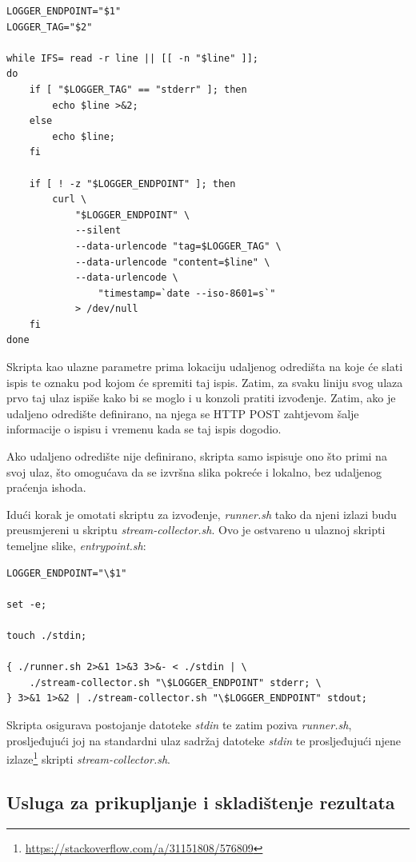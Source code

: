 \documentclass[times, utf8, zavrsni]{fer}
\begin{document}
\begin{lstlisting}
LOGGER_ENDPOINT="$1"
LOGGER_TAG="$2"

while IFS= read -r line || [[ -n "$line" ]];
do
	if [ "$LOGGER_TAG" == "stderr" ]; then
		echo $line >&2;
	else
		echo $line;
	fi

	if [ ! -z "$LOGGER_ENDPOINT" ]; then
		curl \
			"$LOGGER_ENDPOINT" \
			--silent
			--data-urlencode "tag=$LOGGER_TAG" \
			--data-urlencode "content=$line" \
			--data-urlencode \
				"timestamp=`date --iso-8601=s`"
			> /dev/null
	fi
done
\end{lstlisting}

Skripta kao ulazne parametre prima lokaciju udaljenog odredišta na koje će slati ispis te oznaku pod kojom će spremiti taj ispis. Zatim, za svaku liniju svog ulaza prvo taj ulaz ispiše kako bi se moglo i u konzoli pratiti izvođenje. Zatim, ako je udaljeno odredište definirano, na njega se HTTP POST zahtjevom šalje informacije o ispisu i vremenu kada se taj ispis dogodio.

Ako udaljeno odredište nije definirano, skripta samo ispisuje ono što primi na svoj ulaz, što omogućava da se izvršna slika pokreće i lokalno, bez udaljenog praćenja ishoda.

Idući korak je omotati skriptu za izvođenje, {\textit{runner.sh}} tako da njeni izlazi budu preusmjereni u skriptu {\textit{stream-collector.sh}}. Ovo je ostvareno u ulaznoj skripti temeljne slike, {\textit{entrypoint.sh}}:

\begin{lstlisting}
LOGGER_ENDPOINT="\$1"

set -e;

touch ./stdin;

{ ./runner.sh 2>&1 1>&3 3>&- < ./stdin | \
	./stream-collector.sh "\$LOGGER_ENDPOINT" stderr; \
} 3>&1 1>&2 | ./stream-collector.sh "\$LOGGER_ENDPOINT" stdout;
\end{lstlisting}

Skripta osigurava postojanje datoteke {\textit{stdin}} te zatim poziva {\textit{runner.sh}}, prosljeđujući joj na standardni ulaz sadržaj datoteke {\textit{stdin}} te prosljeđujući njene izlaze{\footnote{\url{https://stackoverflow.com/a/31151808/576809}}} skripti {\textit{stream-collector.sh}}.

\subsection{Usluga za prikupljanje i skladištenje rezultata}
\end{document}
